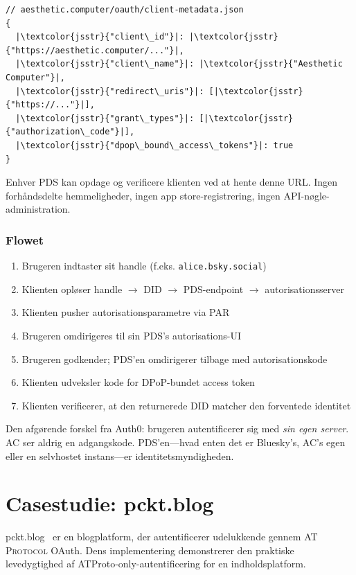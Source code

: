 \documentclass[10pt,letterpaper,twocolumn]{article}
\newcommand{\atproto}{\textsc{AT Protocol}}
\begin{document}
\begin{lstlisting}[style=acjsstyle]
// aesthetic.computer/oauth/client-metadata.json
{
  |\textcolor{jsstr}{"client\_id"}|: |\textcolor{jsstr}{"https://aesthetic.computer/..."}|,
  |\textcolor{jsstr}{"client\_name"}|: |\textcolor{jsstr}{"Aesthetic Computer"}|,
  |\textcolor{jsstr}{"redirect\_uris"}|: [|\textcolor{jsstr}{"https://..."}|],
  |\textcolor{jsstr}{"grant\_types"}|: [|\textcolor{jsstr}{"authorization\_code"}|],
  |\textcolor{jsstr}{"dpop\_bound\_access\_tokens"}|: true
}
\end{lstlisting}

Enhver PDS kan opdage og verificere klienten ved at hente denne URL. Ingen forhåndsdelte hemmeligheder, ingen app store-registrering, ingen API-nøgle-administration.

\subsubsection{Flowet}

\begin{enumerate}
  \item Brugeren indtaster sit handle (f.eks. \texttt{alice.bsky.social})
  \item Klienten opløser handle $\to$ DID $\to$ PDS-endpoint $\to$ autorisationsserver
  \item Klienten pusher autorisationsparametre via PAR
  \item Brugeren omdirigeres til sin PDS's autorisations-UI
  \item Brugeren godkender; PDS'en omdirigerer tilbage med autorisationskode
  \item Klienten udveksler kode for DPoP-bundet access token
  \item Klienten verificerer, at den returnerede DID matcher den forventede identitet
\end{enumerate}

Den afgørende forskel fra Auth0: brugeren autentificerer sig med \emph{sin egen server}. AC ser aldrig en adgangskode. PDS'en---hvad enten det er Bluesky's, AC's egen eller en selvhostet instans---er identitetsmyndigheden.


\section{Casestudie: pckt.blog}
\label{sec:pckt}

pckt.blog~\citep{pcktblog2025} er en blogplatform, der autentificerer udelukkende gennem \atproto{} OAuth. Dens implementering demonstrerer den praktiske levedygtighed af ATProto-only-autentificering for en indholdsplatform.
\end{document}
